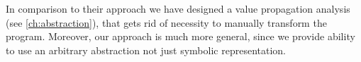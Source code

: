 In comparison to their approach we have designed a value propagation analysis
(see \autoref{ch:abstraction}), that gets rid of necessity to manually transform
the program. Moreover, our approach is much more general, since we provide
ability to use an arbitrary abstraction not just symbolic representation.


